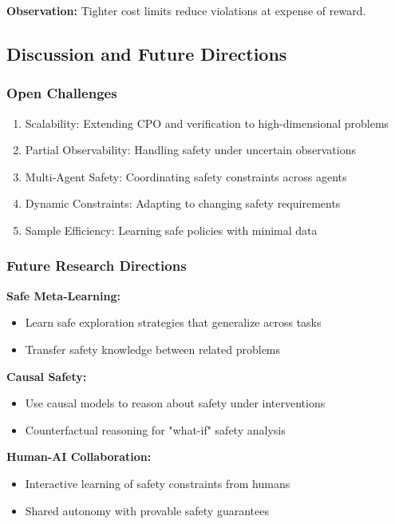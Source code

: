 \documentclass[12pt]{article}
\begin{document}
{{{{\textbf{Observation:} Tighter cost limits reduce violations at expense of reward.

\subsection{Discussion and Future Directions}

\subsubsection{Open Challenges}

\begin{enumerate}
\item Scalability: Extending CPO and verification to high-dimensional problems
\item Partial Observability: Handling safety under uncertain observations
\item Multi-Agent Safety: Coordinating safety constraints across agents
\item Dynamic Constraints: Adapting to changing safety requirements
\item Sample Efficiency: Learning safe policies with minimal data
\end{enumerate}

\subsubsection{Future Research Directions}

\textbf{Safe Meta-Learning:}
\begin{itemize}
\item Learn safe exploration strategies that generalize across tasks
\item Transfer safety knowledge between related problems
\end{itemize}

\textbf{Causal Safety:}
\begin{itemize}
\item Use causal models to reason about safety under interventions
\item Counterfactual reasoning for "what-if" safety analysis
\end{itemize}

\textbf{Human-AI Collaboration:}
\begin{itemize}
\item Interactive learning of safety constraints from humans
\item Shared autonomy with provable safety guarantees
\end{itemize}

}}}}
\end{document}
